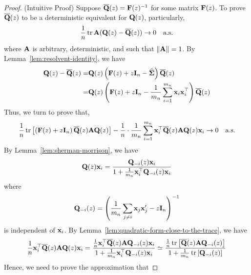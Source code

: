 \begin{proof}
	(Intuitive Proof) Suppose \(\overline{\mathbf{Q}}(z)=\mathbf{F}(z)^{-1}\) for some matrix \(\mathbf{F}(z)\). To prove \(\overline{\mathbf{Q}}(z)\) to be a deterministic equivalent for \(\mathbf{Q}(z)\), particularly,
	\begin{equation*}
		\frac{1}{n}\operatorname{tr}\mathbf{A}(\mathbf{Q}(z)-\overline{\mathbf{Q}}(z))\rightarrow 0\quad\text{a.s.}
	\end{equation*}
	where \(\mathbf{A}\) is arbitrary, deterministic, and such that \(\|\mathbf{A}\|=1\). By Lemma~\ref{lem:resolvent-identity}, we have
	\begin{equation*}
		\begin{aligned}
			\mathbf{Q}(z)-\overline{\mathbf{Q}}(z)= & \mathbf{Q}(z)\left(\mathbf{F}(z)+z\mathbf{I}_{n}-\widehat{\boldsymbol{\Sigma}}\right) \overline{\mathbf{Q}}(z)                                      \\
			=                           & \mathbf{Q}(z)\left(\mathbf{F}(z)+z\mathbf{I}_{n}-\frac{1}{m_{n}}\sum_{i=1}^{m_{n}}\mathbf{x}_{i}\mathbf{x}_{i}^{\top}\right)\overline{\mathbf{Q}}(z)
		\end{aligned}
	\end{equation*}
	Thus, we turn to prove that,
	\begin{equation*}
		\frac{1}{n}\operatorname{tr}\left[\left(\mathbf{F}(z)+z\mathbf{I}_{n}\right)\overline{\mathbf{Q}}(z)\mathbf{A}\mathbf{Q}(z)\right]-\frac{1}{n}\cdot\frac{1}{m_{n}}\sum_{i=1}^{m_{n}}\mathbf{x}_{i}^{\top}\overline{\mathbf{Q}}(z)\mathbf{A}\mathbf{Q}(z)\mathbf{x}_{i}\rightarrow 0\quad\text{a.s.}
	\end{equation*}
	By Lemma~\ref{lem:sherman-morrison}, we have
	\begin{equation*}
		\mathbf{Q}(z)\mathbf{x}_{i}=\frac{\mathbf{Q}_{-i}(z)\mathbf{x}_{i}}{1+\frac{1}{m_{n}}\mathbf{x}_{i}^{\top}\mathbf{Q}_{-i}(z)\mathbf{x}_{i}}
	\end{equation*}
	where
	\begin{equation*}
		\mathbf{Q}_{-i}(z)=\left(\frac{1}{m_{n}}\sum_{j\neq i}\mathbf{x}_{j}\mathbf{x}_{j}^{\prime}-z\mathbf{I}_{n}\right)^{-1}
	\end{equation*}
	is independent of \(\mathbf{x}_{i}\). By Lemma~\ref{lem:quadratic-form-close-to-the-trace}, we have
	\begin{equation*}
		\frac{1}{n}\mathbf{x}_{i}^{\top}\overline{\mathbf{Q}}(z)\mathbf{A}\mathbf{Q}(z)\mathbf{x}_{i}=\frac{\frac{1}{n}\mathbf{x}_{i}^{\top}\overline{\mathbf{Q}}(z)\mathbf{A}\mathbf{Q}_{-i}(z)\mathbf{x}_{i}}{1+\frac{1}{m_{n}}\mathbf{x}_{i}^{\top}\mathbf{Q}_{-i}(z)\mathbf{x}_{i}}\simeq\frac{\frac{1}{n}\operatorname{tr}\left[\overline{\mathbf{Q}}(z)\mathbf{A}\mathbf{Q}_{-i}(z)\right]}{1+\frac{1}{m_{n}}\operatorname{tr}\left[\mathbf{Q}_{-i}(z)\right]}
	\end{equation*}
	Hence, we need to prove the approximation that

\end{proof}
